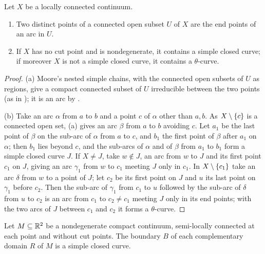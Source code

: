 
\begin{proposition}\label{prop:cyclic-peano}
Let $X$ be a locally connected continuum.
\begin{enumerate}[label=(\alph*)]
\item Two distinct points of a connected open subset $U$ of $X$ are the end points of an arc in $U$.
\item If $X$ has no cut point and is nondegenerate, it contains a simple closed curve; if moreover $X$ is not a simple closed curve, it contains a $\theta$-curve.
\end{enumerate}
\end{proposition}

\begin{proof}
(a) Moore's nested simple chains, with the connected open subsets of $U$ as regions, give a compact connected subset of $U$ irreducible between the two points (as in ); it is an arc
by .

(b) Take an arc $\alpha$ from $a$ to $b$ and a point $c$ of $\alpha$ other than $a,b$. As $X\setminus\left\{ c \right\}$ is a connected open set, (a) gives an arc $\beta$ from $a$ to $b$ avoiding $c$. Let $a_1$ be the last point of $\beta$
on the sub-arc of $\alpha$ from $a$ to $c$, and $b_1$ the first point of $\beta$ after $a_1$ on $\alpha$; then $b_1$ lies beyond $c$, and the sub-arcs of $\alpha$ and of $\beta$ from $a_1$ to $b_1$ form a simple closed curve
$J$. If $X\ne J$, take $w\notin J$, an arc from $w$ to $J$ and its first point $c_1$ on $J$, giving an arc $\gamma_1$ from $w$ to $c_1$ meeting $J$ only in $c_1$. In $X\setminus\left\{ c_1 \right\}$ take an arc $\delta$ from $w$ to a
point of $J$; let $c_2$ be its first point on $J$ and $u$ its last point on $\gamma_1$ before $c_2$. Then the sub-arc of $\gamma_1$ from $c_1$ to $u$ followed by the sub-arc of $\delta$ from $u$ to $c_2$ is an arc from $c_1$ to $c_2\ne
c_1$ meeting $J$ only in its end points; with the two arcs of $J$ between $c_1$ and $c_2$ it forms a $\theta$-curve.
\end{proof}


\begin{theorem}\label{thm:whyburn-cor1}
Let $M\subseteq\mathbb{R}^2$ be a nondegenerate compact continuum, semi-locally connected at each point and without cut points. The boundary $B$ of each complementary domain $R$ of $M$ is a simple closed curve.
\end{theorem}

